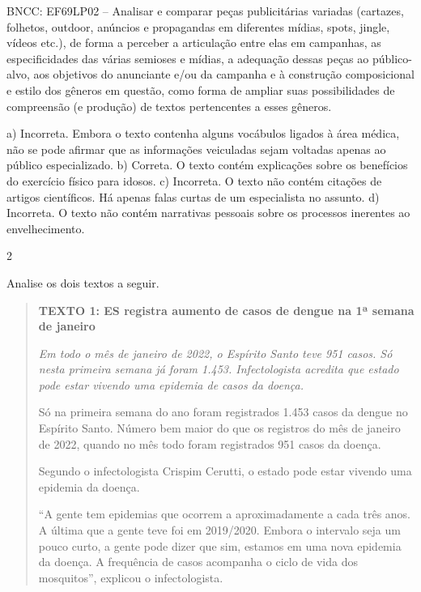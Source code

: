 {{{BNCC: EF69LP02 -- Analisar e comparar peças publicitárias variadas
(cartazes, folhetos, outdoor, anúncios e propagandas em diferentes
mídias, spots, jingle, vídeos etc.), de forma a perceber a articulação
entre elas em campanhas, as especificidades das várias semioses e
mídias, a adequação dessas peças ao público-alvo, aos objetivos do
anunciante e/ou da campanha e à construção composicional e estilo dos
gêneros em questão, como forma de ampliar suas possibilidades de
compreensão (e produção) de textos pertencentes a esses gêneros.

a) Incorreta. Embora o texto contenha alguns vocábulos ligados à área médica, não se pode 
afirmar que as informações veiculadas sejam voltadas apenas ao público especializado.
b) Correta. O texto contém explicações sobre os benefícios do exercício físico para idosos.
c) Incorreta. O texto não contém citações de artigos científicos. Há apenas falas curtas de um
especialista no assunto.
d) Incorreta. O texto não contém narrativas pessoais sobre os processos inerentes ao envelhecimento.}

\num{2}

Analise os dois textos a seguir.

\begin{quote}

\textbf{TEXTO 1: ES registra aumento de casos de dengue na 1ª semana de janeiro}

\textit{Em todo o mês de janeiro de 2022, o Espírito Santo teve 951
casos. Só nesta primeira semana já foram 1.453. Infectologista acredita
que estado pode estar vivendo uma epidemia de casos da doença.}

Só na primeira semana do ano foram registrados 1.453 casos da dengue no
Espírito Santo. Número bem maior do que os registros do mês de janeiro
de 2022, quando no mês todo foram registrados 951 casos da doença.

Segundo o infectologista Crispim Cerutti, o estado pode estar vivendo
uma epidemia da doença.

``A gente tem epidemias que ocorrem a aproximadamente a cada três anos. A
última que a gente teve foi em 2019/2020. Embora o intervalo seja um
pouco curto, a gente pode dizer que sim, estamos em uma nova epidemia da
doença. A frequência de casos acompanha o ciclo de vida dos mosquitos'',
explicou o infectologista.

\end{quote}


}}
